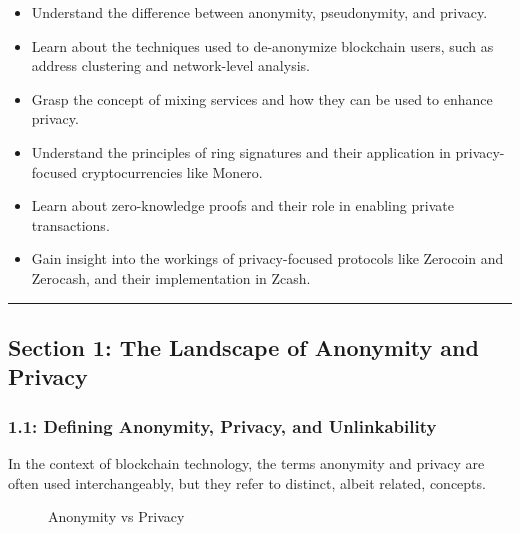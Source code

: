 \begin{itemize}
\tightlist
\item
  Understand the difference between anonymity, pseudonymity, and
  privacy.
\item
  Learn about the techniques used to de-anonymize blockchain users, such
  as address clustering and network-level analysis.
\item
  Grasp the concept of mixing services and how they can be used to
  enhance privacy.
\item
  Understand the principles of ring signatures and their application in
  privacy-focused cryptocurrencies like Monero.
\item
  Learn about zero-knowledge proofs and their role in enabling private
  transactions.
\item
  Gain insight into the workings of privacy-focused protocols like
  Zerocoin and Zerocash, and their implementation in Zcash.
\end{itemize}

\begin{center}\rule{0.5\linewidth}{0.5pt}\end{center}

\subsection{Section 1: The Landscape of Anonymity and
Privacy}\label{section-1-the-landscape-of-anonymity-and-privacy}

\subsubsection{1.1: Defining Anonymity, Privacy, and
Unlinkability}\label{defining-anonymity-privacy-and-unlinkability}

In the context of blockchain technology, the terms anonymity and privacy
are often used interchangeably, but they refer to distinct, albeit
related, concepts.

\begin{figure}
\centering
\caption{Anonymity vs Privacy}
\end{figure}

